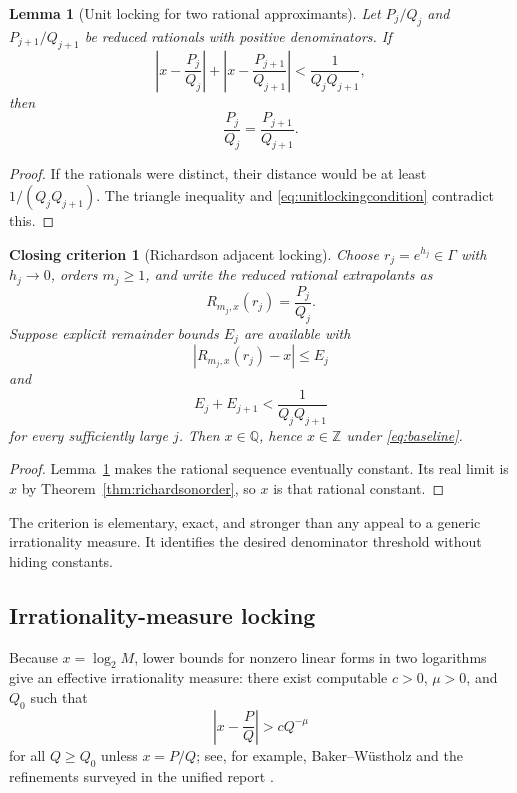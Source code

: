 \documentclass[11pt,oneside]{article}
\newtheorem{lemma}[theorem]{Lemma}
\newtheorem{criterion}[theorem]{Closing criterion}
\theoremstyle{definition}
\theoremstyle{remark}
\newcommand{\Z}{\mathbb Z}
\newcommand{\Q}{\mathbb Q}
\begin{document}
\begin{lemma}[Unit locking for two rational approximants]
\label{lem:unitlocking}
Let $P_j/Q_j$ and $P_{j+1}/Q_{j+1}$ be reduced rationals with positive denominators.  If
\begin{equation}
 \left|x-\frac{P_j}{Q_j}\right|
 +\left|x-\frac{P_{j+1}}{Q_{j+1}}\right|
 <\frac1{Q_jQ_{j+1}},
 \label{eq:unitlockingcondition}
\end{equation}
then
\[
 \frac{P_j}{Q_j}=\frac{P_{j+1}}{Q_{j+1}}.
\]
\end{lemma}

\begin{proof}
If the rationals were distinct, their distance would be at least $1/(Q_jQ_{j+1})$.  The
triangle inequality and \eqref{eq:unitlockingcondition} contradict this.
\end{proof}

\begin{criterion}[Richardson adjacent locking]
\label{crit:richardsonlocking}
Choose $r_j=e^{h_j}\in\Gamma$ with $h_j\to0$, orders $m_j\ge1$, and write the reduced rational
extrapolants as
\[
 R_{m_j,x}(r_j)=\frac{P_j}{Q_j}.
\]
Suppose explicit remainder bounds $E_j$ are available with
\[
 \left|R_{m_j,x}(r_j)-x\right|\le E_j
\]
and
\begin{equation}
 E_j+E_{j+1}<\frac1{Q_jQ_{j+1}}
 \label{eq:lockingtarget}
\end{equation}
for every sufficiently large $j$.  Then $x\in\Q$, hence $x\in\Z$ under
\eqref{eq:baseline}.
\end{criterion}

\begin{proof}
Lemma~\ref{lem:unitlocking} makes the rational sequence eventually constant.  Its real limit is
$x$ by Theorem~\ref{thm:richardsonorder}, so $x$ is that rational constant.
\end{proof}

The criterion is elementary, exact, and stronger than any appeal to a generic irrationality
measure.  It identifies the desired denominator threshold without hiding constants.

\subsection{Irrationality-measure locking}

Because $x=\log_2 M$, lower bounds for nonzero linear forms in two logarithms give an
effective irrationality measure: there exist computable $c>0$, $\mu>0$, and $Q_0$ such that
\begin{equation}
 \left|x-\frac{P}{Q}\right|>cQ^{-\mu}
 \label{eq:irrmeasure}
\end{equation}
for all $Q\ge Q_0$ unless $x=P/Q$; see, for example,
Baker--W\"ustholz and the refinements surveyed in the unified report
\cite{BakerWustholz,BakerBook}.
\end{document}
